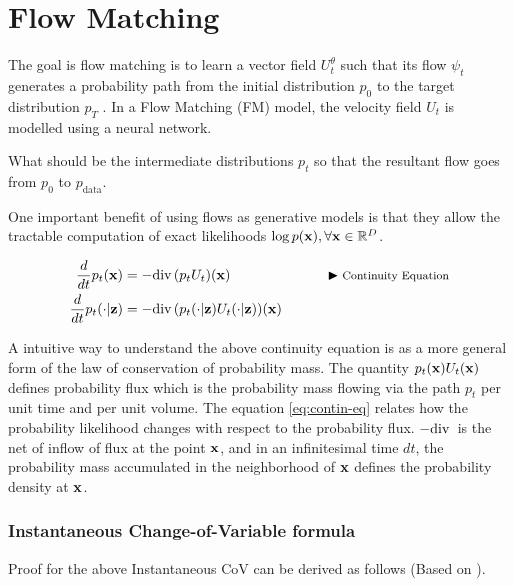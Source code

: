 \documentclass[a4paper, 11pt]{article}
\begin{document}
\section{Flow Matching}
The goal is flow matching is to learn a vector field $U_t^{\theta}$ such that its flow $\psi_t$ generates a probability path from the initial distribution $p_0$ to the target distribution $p_T$ \citep{lipman2024flow}. In a Flow Matching (FM) model, the velocity field $U_t$ is modelled using a neural network.

What should be the intermediate distributions $p_t$ so that the resultant flow goes from $p_0$ to $p_{\text{data}}$.

\begin{Takeaway}{}{}
    One important benefit of using flows as generative models is that they allow the tractable computation of exact likelihoods $\log p(\mbox{$\mbox{$\mathbf{x}$}$}), \forall \mbox{$\mbox{$\mathbf{x}$}$} \in \mathbb{R}^D$.
\end{Takeaway}


\begin{align}
    \frac{d}{dt} p_t(\mbox{$\mbox{$\mathbf{x}$}$}) &= - \text{div}\, (p_t U_t)(\mbox{$\mbox{$\mathbf{x}$}$}) && \qquad \blacktriangleright\text{\footnotesize Continuity Equation} \label{eq:contin-eq}\\ 
    \frac{d}{dt} p_t(\cdot | \mbox{$\mbox{$\mathbf{z}$}$}) &= - \text{div}\, (p_t(\cdot |\mbox{$\mbox{$\mathbf{z}$}$}) U_t(\cdot |\mbox{$\mbox{$\mathbf{z}$}$}))(\mbox{$\mbox{$\mathbf{x}$}$}) \label{eq:contin-cond-eq}
\end{align}

A intuitive way to understand the above continuity equation is as a more general form of the law of conservation of probability mass. The quantity $p_t(\mbox{$\mbox{$\mathbf{x}$}$})U_t(\mbox{$\mbox{$\mathbf{x}$}$})$ defines probability flux which is the probability mass flowing via the path $p_t$ per unit time and per unit volume. The equation \eqref{eq:contin-eq} relates how the probability likelihood changes with respect to the probability flux. $- \text{div}\,$ is the net of inflow of flux at the point $\mbox{$\mbox{$\mathbf{x}$}$}$, and in an infinitesimal time $dt$, the probability mass accumulated in the neighborhood of $\mbox{$\mbox{$\mathbf{x}$}$}$ defines the probability density at $\mbox{$\mbox{$\mathbf{x}$}$}$.
 

\subsubsection{Instantaneous Change-of-Variable formula}

Proof for the above Instantaneous CoV can be derived as follows (Based on \cite{mathieu2020riemannian}).
\end{document}
